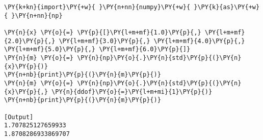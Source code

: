 \begin{Verbatim}[label=\makebox{\href{https://github.com/unipi-physics-labs/lab1-notes/tree/main/snippy/np.std.py}{https://github.com/.../np.std.py}},commandchars=\\\{\}]
\PY{k+kn}{import}\PY{+w}{ }\PY{n+nn}{numpy}\PY{+w}{ }\PY{k}{as}\PY{+w}{ }\PY{n+nn}{np}

\PY{n}{x} \PY{o}{=} \PY{p}{[}\PY{l+m+mf}{1.0}\PY{p}{,} \PY{l+m+mf}{2.0}\PY{p}{,} \PY{l+m+mf}{3.0}\PY{p}{,} \PY{l+m+mf}{4.0}\PY{p}{,} \PY{l+m+mf}{5.0}\PY{p}{,} \PY{l+m+mf}{6.0}\PY{p}{]}
\PY{n}{m} \PY{o}{=} \PY{n}{np}\PY{o}{.}\PY{n}{std}\PY{p}{(}\PY{n}{x}\PY{p}{)}
\PY{n+nb}{print}\PY{p}{(}\PY{n}{m}\PY{p}{)}
\PY{n}{m} \PY{o}{=} \PY{n}{np}\PY{o}{.}\PY{n}{std}\PY{p}{(}\PY{n}{x}\PY{p}{,} \PY{n}{ddof}\PY{o}{=}\PY{l+m+mi}{1}\PY{p}{)}
\PY{n+nb}{print}\PY{p}{(}\PY{n}{m}\PY{p}{)}

[Output]
1.707825127659933
1.8708286933869707
\end{Verbatim}
